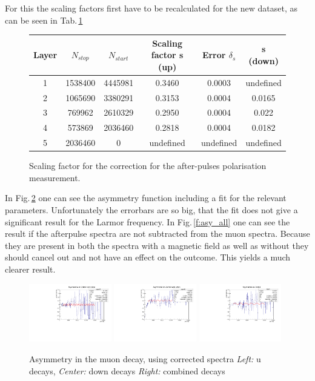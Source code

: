 For this the scaling factors first have to be recalculated for the new dataset, as can be seen in Tab.\,\ref{t:new_s}

\begin{figure}[H]
\begin{tabularx}{\textwidth}{ c | c | c | c | c | c }
Layer & $N_{stop}$ & $N_{start}$ & Scaling factor s (up) & Error $\delta_s$ & s (down)\\
\hline
1 & 1538400 & 4445981 & 0.3460 & 0.0003 & undefined\\
2 & 1065690 & 3380291 & 0.3153 & 0.0004 & 0.0165\\
3 & 769962 & 2610329 & 0.2950 & 0.0004 & 0.022\\
4 & 573869 & 2036460 & 0.2818 & 0.0004 & 0.0182\\
5 & 2036460 & 0 & undefined & undefined & undefined
\end{tabularx}
\caption{Scaling factor for the correction for the after-pulses polarisation measurement.}
\label{t:new_s}
\end{figure}


In Fig.\,\ref{f:asy} one can see the asymmetry function including a fit for the relevant parameters. Unfortunately the errorbars are so big, that the fit does not give a significant result for the Larmor frequency. In Fig.\,\ref{f:asy_all} one can see the result if the afterpulse spectra are not subtracted from the muon spectra. Because they are present in both the spectra with a magnetic field as well as without they should cancel out and not have an effect on the outcome. This yields a much clearer result. 

\begin{figure}[H]
    \centering
    \includegraphics[width=0.32\textwidth]{figures/Asymmetrie/asy_up_s_1.pdf}
    \includegraphics[width=0.32\textwidth]{figures/Asymmetrie/asy_down_s_1.pdf}
    \includegraphics[width=0.32\textwidth]{figures/Asymmetrie/asy_all_s_1.pdf}
    \caption{Asymmetry in the muon decay, using corrected spectra \emph{Left:} u decays, \emph{Center:} down decays \emph{Right:} combined decays}
    \label{f:asy}
\end{figure}

